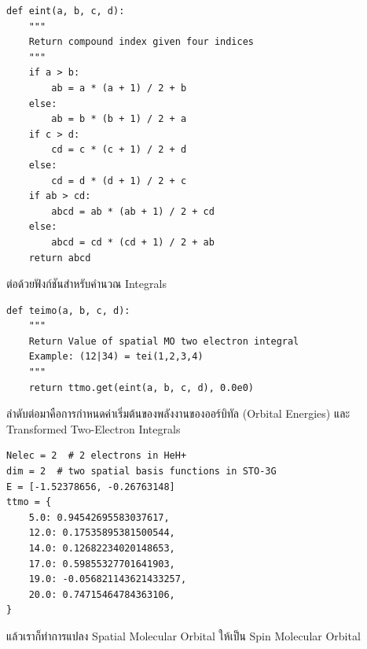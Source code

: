 \vspace{5pt}

\begin{lstlisting}[style=MyPython]
def eint(a, b, c, d):
    """
    Return compound index given four indices
    """    
    if a > b:
        ab = a * (a + 1) / 2 + b
    else:
        ab = b * (b + 1) / 2 + a
    if c > d:
        cd = c * (c + 1) / 2 + d
    else:
        cd = d * (d + 1) / 2 + c
    if ab > cd:
        abcd = ab * (ab + 1) / 2 + cd
    else:
        abcd = cd * (cd + 1) / 2 + ab
    return abcd
\end{lstlisting}

\vspace{5pt}

\noindent ต่อด้วยฟังก์ชันสำหรับคำนวณ Integrals

\vspace{5pt}

\begin{lstlisting}[style=MyPython]
def teimo(a, b, c, d):
    """
    Return Value of spatial MO two electron integral
    Example: (12|34) = tei(1,2,3,4)
    """
    return ttmo.get(eint(a, b, c, d), 0.0e0)
\end{lstlisting}

\vspace{5pt}

\noindent ลำดับต่อมาคือการกำหนดค่าเริ่มต้นของพลังงานของออร์บิทัล (Orbital Energies) และ Transformed Two-Electron Integrals

\vspace{5pt}

\begin{lstlisting}[style=MyPython]
Nelec = 2  # 2 electrons in HeH+
dim = 2  # two spatial basis functions in STO-3G
E = [-1.52378656, -0.26763148]
ttmo = {
    5.0: 0.94542695583037617,
    12.0: 0.17535895381500544,
    14.0: 0.12682234020148653,
    17.0: 0.59855327701641903,
    19.0: -0.056821143621433257,
    20.0: 0.74715464784363106,
}
\end{lstlisting}

\vspace{5pt}

\noindent แล้วเราก็ทำการแปลง Spatial Molecular Orbital ให้เป็น Spin Molecular Orbital

\vspace{5pt}

